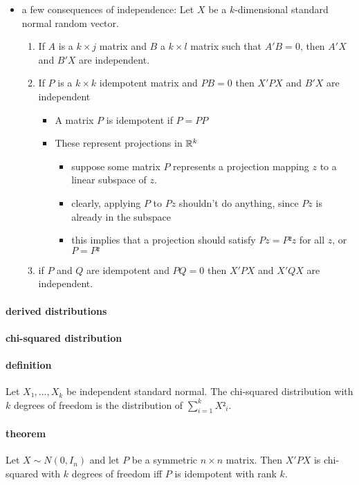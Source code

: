 \begin{itemize}
\item a few consequences of independence:
        Let $X$ be a $k$-dimensional standard normal random vector.
\begin{enumerate}
\item If $A$ is a $k × j$ matrix and $B$ a $k × l$ matrix such that
  $A'B = 0$, then $A'X$ and $B'X$ are independent.
\item If $P$ is a $k× k$ idempotent matrix and $PB = 0$ then
           $X'PX$ and $B'X$ are independent
\begin{itemize}
\item A matrix $P$ is idempotent if $P = PP$
\item These represent projections in $\mathbb{R}^k$
\begin{itemize}
\item suppose some matrix $P$ represents a projection mapping $z$ to a linear subspace of $z$.
\item clearly, applying $P$ to $Pz$ shouldn't do anything, since $Pz$ is already in the subspace
\item this implies that a projection should satisfy $Pz = P² z$ for all $z$, or $P = P²$
\end{itemize}
\end{itemize}
\item if $P$ and $Q$ are idempotent and $PQ = 0$ then $X'PX$ and
           $X'QX$ are independent.
\end{enumerate}
\end{itemize}

\paragraph{derived distributions}

\paragraph{chi-squared distribution}

\paragraph{definition}
       Let $X₁,...,X_k$ be independent standard normal.  The
       chi-squared distribution with $k$ degrees of freedom is the
       distribution of $∑_{i=1}^k X²_i$.

\paragraph{theorem}
       Let $X ∼ N(0, I_n)$ and let $P$ be a symmetric $n × n$
       matrix.  Then $X'PX$ is chi-squared with $k$ degrees of freedom
       iff $P$ is idempotent with rank $k$.

